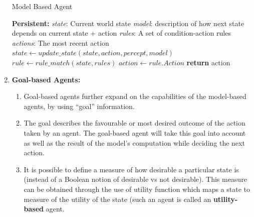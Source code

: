 \documentclass{article}
\theoremstyle{plain}
\theoremstyle{definition}
\begin{document}
\begin{enumerate}
        \begin{algorithm}[ht]
            \caption{Model Based Agent}
            \begin{algorithmic}[1]
            \State \textbf{Persistent:} 
            \State \textit{state}: Current world state
            \State \textit{model}: description of how next state depends on current state + action
            \State  \textit{rules}: A set of condition-action rules
            \State \textit{actions}: The most recent action \\
            
            
            \State $state \gets update\_state(state, action, percept, model)$
            \State $rule \gets rule\_match(state, rules)$
            \State $action \gets rule.Action$
            \State \textbf{return} action
            \EndProcedure
            
            \end{algorithmic}
        \end{algorithm}
        \break
        \item \textbf{Goal-based Agents:}
        \begin{enumerate}
            \item Goal-based agents further expand on the capabilities of the model-based agents, by using “goal” information.
            
            \item The goal describes the favourable or most desired outcome of the action taken by an agent. The goal-based agent will take this goal into account as well as the result of the model's computation while deciding the next action.
            
            \item It is possible to define a measure of how desirable a particular state is (instead of a Boolean notion of desirable vs not desirable). This measure can be obtained through the use of utility function which maps a state to measure of the utility of the state (such an agent is called an \textbf{utility-based} agent. 
            

\end{enumerate}
\end{enumerate}
\end{document}
